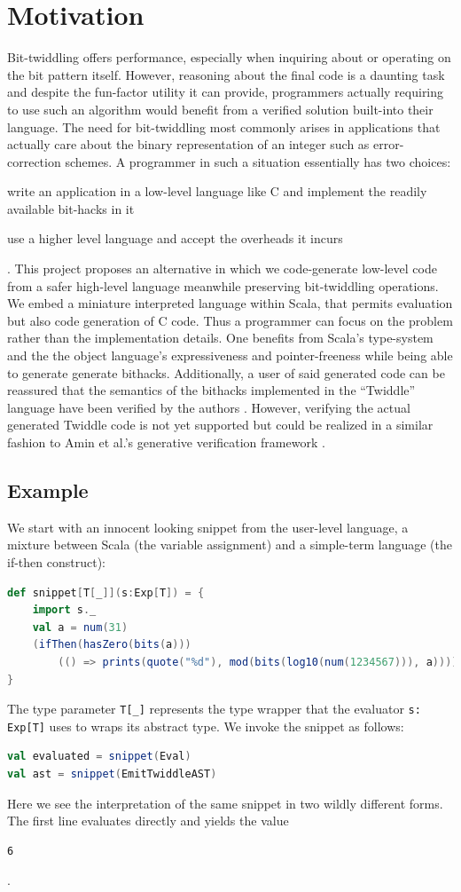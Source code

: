 \documentclass{article}
\begin{document}
\section{Motivation}
Bit-twiddling offers performance, especially when inquiring about or operating on the bit pattern itself. However, reasoning about the final code is a daunting task and despite the fun-factor utility it can provide, programmers actually requiring to use such an algorithm would benefit from a verified solution built-into their language. The need for bit-twiddling most commonly arises in applications that actually care about the binary representation of an integer such as error-correction schemes. A programmer in such a situation essentially has two choices:
\begin{enumerate*}[label=(\arabic*)]
	\item write an application in a low-level language like C and implement the readily available bit-hacks in it
	\item use a higher level language and accept the overheads it incurs
\end{enumerate*}. This project proposes an alternative in which we code-generate low-level code from a safer high-level language meanwhile preserving bit-twiddling operations. We embed a miniature interpreted language within Scala, that permits evaluation but also code generation of C code. Thus a programmer can focus on the problem rather than the implementation details. One benefits from Scala's type-system and the the object language's expressiveness and pointer-freeness while being able to generate generate bithacks. Additionally, a user of said generated code can be reassured that the semantics of the bithacks implemented in the ``Twiddle'' language have been verified by the authors \cite{anderson2005bit}. However, verifying the actual generated Twiddle code is not yet supported but could be realized in a similar fashion to Amin et al.'s generative verification framework \cite{amin2017lms}.

\pagebreak
\subsection{Example}
We start with an innocent looking snippet from the user-level language, a mixture between Scala (the variable assignment) and a simple-term language (the if-then construct):
\begin{lstlisting}[language=Scala]
def snippet[T[_]](s:Exp[T]) = {
	import s._
	val a = num(31)
	(ifThen(hasZero(bits(a)))
		(() => prints(quote("%d"), mod(bits(log10(num(1234567))), a))))
}
\end{lstlisting}
The type parameter \texttt{T[\_]} represents the type wrapper that the evaluator \texttt{s: Exp[T]} uses to wraps its abstract type. We invoke the snippet as follows:
\begin{lstlisting}[language=Scala]
val evaluated = snippet(Eval)
val ast = snippet(EmitTwiddleAST)
\end{lstlisting}
Here we see the interpretation of the same snippet in two wildly different forms. The first line evaluates directly and yields the value \begin{verbatim}6\end{verbatim}.
\end{document}
